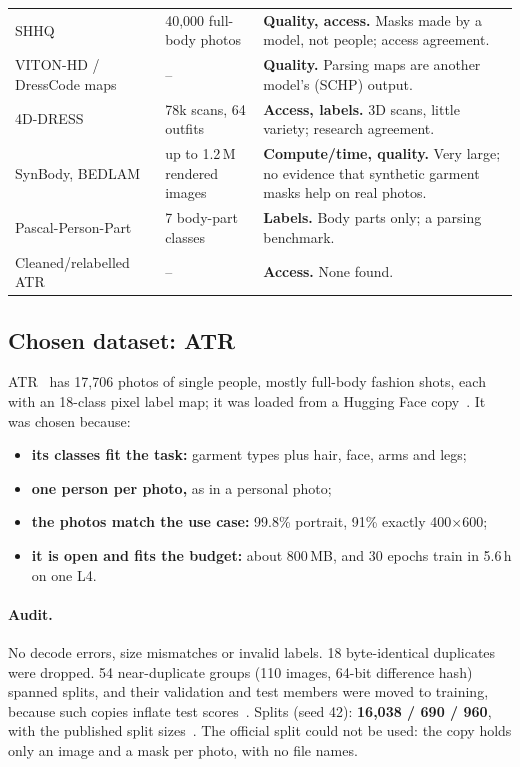 \documentclass[conference,a4paper]{IEEEtran}
\begin{document}
\begin{table}[t]
\begin{tabularx}{\textwidth}{@{}P{2.7cm}P{3.0cm}L@{}}
SHHQ~\cite{shhq} & 40,000 full-body photos & \textbf{Quality, access.} Masks made by a model, not people; access agreement.\\
VITON-HD / DressCode maps~\cite{dresscode} & -- & \textbf{Quality.} Parsing maps are another model's (SCHP) output.\\
4D-DRESS~\cite{fourddress} & 78k scans, 64 outfits & \textbf{Access, labels.} 3D scans, little variety; research agreement.\\
SynBody, BEDLAM~\cite{synbody} & up to 1.2\,M rendered images & \textbf{Compute/time, quality.} Very large; no evidence that synthetic garment masks help on real photos.\\
Pascal-Person-Part~\cite{schp} & 7 body-part classes & \textbf{Labels.} Body parts only; a parsing benchmark.\\
Cleaned/relabelled ATR & -- & \textbf{Access.} None found.\\
\bottomrule
\end{tabularx}
\end{table}

\subsection{Chosen dataset: ATR}
ATR~\cite{atr} has 17,706 photos of single people, mostly full-body fashion shots, each with an 18-class pixel label map; it was loaded from a Hugging Face copy~\cite{atrhf}. It was chosen because:
\begin{itemize}
  \item \textbf{its classes fit the task:} garment types plus hair, face, arms and legs;
  \item \textbf{one person per photo,} as in a personal photo;
  \item \textbf{the photos match the use case:} 99.8\% portrait, 91\% exactly 400$\times$600;
  \item \textbf{it is open and fits the budget:} about 800\,MB, and 30 epochs train in 5.6\,h on one L4.
\end{itemize}

\paragraph{Audit.} No decode errors, size mismatches or invalid labels. 18 byte-identical duplicates were dropped. 54 near-duplicate groups (110 images, 64-bit difference hash) spanned splits, and their validation and test members were moved to training, because such copies inflate test scores~\cite{barz}. Splits (seed 42): \textbf{16,038 / 690 / 960}, with the published split sizes~\cite{graphonomy}. The official split could not be used: the copy holds only an image and a mask per photo, with no file names.
\end{document}
